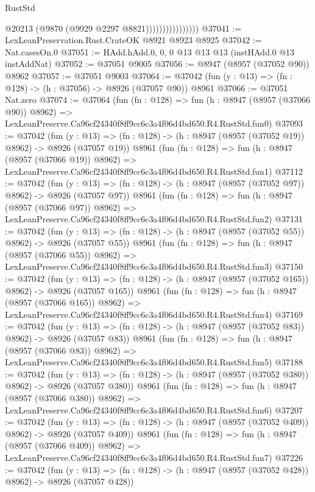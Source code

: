 \begin{lexlean}{RustStd}
\begin{coremodule}
                                @20213
                                (@9870 (@9929 @2297 @8821))))))))))))))))
@37041 := LexLeanPreservation.Rust.CrateOK @8921 @8923 @8925
@37042 := Nat.casesOn.{0}
@37051 := HAdd.hAdd.{0, 0, 0} @13 @13 @13 (instHAdd.{0} @13 instAddNat)
@37052 := @37051 @9005
@37056 := @8947 (@8957 (@37052 @90)) @8962
@37057 := @37051 @9003
@37064 := @37042 (fun (y : @13) => (fn : @128) -> (h : @37056) -> @8926 (@37057 @90)) @8961
@37066 := @37051 Nat.zero
@37074 := @37064
    (fun (fn : @128) =>
    fun (h : @8947 (@8957 (@37066 @90)) @8962) =>
    LexLeanPreserve.Ca96cf24340f8ff9cc6c3a4f06d4bd650.R4.RustStd.fun0)
@37093 := @37042
    (fun (y : @13) => (fn : @128) -> (h : @8947 (@8957 (@37052 @19)) @8962) -> @8926 (@37057 @19))
    @8961
    (fun (fn : @128) =>
    fun (h : @8947 (@8957 (@37066 @19)) @8962) =>
    LexLeanPreserve.Ca96cf24340f8ff9cc6c3a4f06d4bd650.R4.RustStd.fun1)
@37112 := @37042
    (fun (y : @13) => (fn : @128) -> (h : @8947 (@8957 (@37052 @97)) @8962) -> @8926 (@37057 @97))
    @8961
    (fun (fn : @128) =>
    fun (h : @8947 (@8957 (@37066 @97)) @8962) =>
    LexLeanPreserve.Ca96cf24340f8ff9cc6c3a4f06d4bd650.R4.RustStd.fun2)
@37131 := @37042
    (fun (y : @13) => (fn : @128) -> (h : @8947 (@8957 (@37052 @55)) @8962) -> @8926 (@37057 @55))
    @8961
    (fun (fn : @128) =>
    fun (h : @8947 (@8957 (@37066 @55)) @8962) =>
    LexLeanPreserve.Ca96cf24340f8ff9cc6c3a4f06d4bd650.R4.RustStd.fun3)
@37150 := @37042
    (fun (y : @13) => (fn : @128) -> (h : @8947 (@8957 (@37052 @165)) @8962) -> @8926 (@37057 @165))
    @8961
    (fun (fn : @128) =>
    fun (h : @8947 (@8957 (@37066 @165)) @8962) =>
    LexLeanPreserve.Ca96cf24340f8ff9cc6c3a4f06d4bd650.R4.RustStd.fun4)
@37169 := @37042
    (fun (y : @13) => (fn : @128) -> (h : @8947 (@8957 (@37052 @83)) @8962) -> @8926 (@37057 @83))
    @8961
    (fun (fn : @128) =>
    fun (h : @8947 (@8957 (@37066 @83)) @8962) =>
    LexLeanPreserve.Ca96cf24340f8ff9cc6c3a4f06d4bd650.R4.RustStd.fun5)
@37188 := @37042
    (fun (y : @13) => (fn : @128) -> (h : @8947 (@8957 (@37052 @380)) @8962) -> @8926 (@37057 @380))
    @8961
    (fun (fn : @128) =>
    fun (h : @8947 (@8957 (@37066 @380)) @8962) =>
    LexLeanPreserve.Ca96cf24340f8ff9cc6c3a4f06d4bd650.R4.RustStd.fun6)
@37207 := @37042
    (fun (y : @13) => (fn : @128) -> (h : @8947 (@8957 (@37052 @409)) @8962) -> @8926 (@37057 @409))
    @8961
    (fun (fn : @128) =>
    fun (h : @8947 (@8957 (@37066 @409)) @8962) =>
    LexLeanPreserve.Ca96cf24340f8ff9cc6c3a4f06d4bd650.R4.RustStd.fun7)
@37226 := @37042
    (fun (y : @13) => (fn : @128) -> (h : @8947 (@8957 (@37052 @428)) @8962) -> @8926 (@37057 @428))

\end{coremodule}
\end{lexlean}
